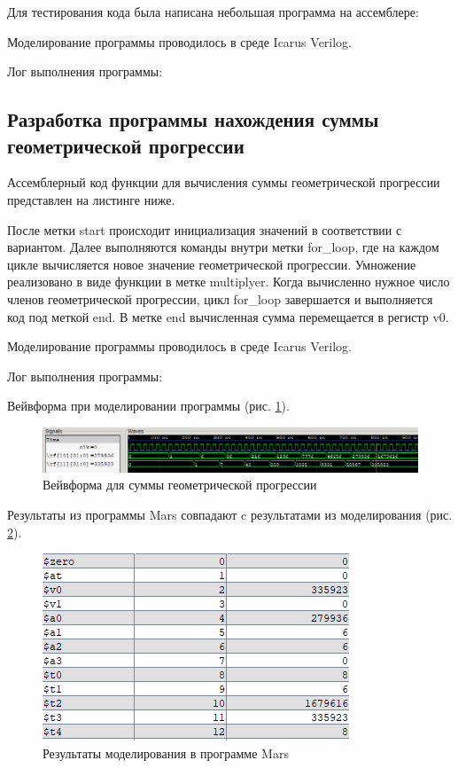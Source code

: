 \documentclass[a4paper,14pt]{article}
\begin{document}
	Для тестирования кода была написана небольшая программа на ассемблере:
		
	{\small {}}
	
	Моделирование программы проводилось в среде Icarus Verilog.
	
	Лог выполнения программы:
	
	{\small {}}
	
	\subsection{Разработка программы нахождения суммы геометрической прогрессии}
	
	Ассемблерный код функции для вычисления суммы геометрической прогрессии представлен на листинге ниже.
	
	{\small {}}
	
	После метки start происходит инициализация значений в соответствии с вариантом.
	Далее выполняются команды внутри метки for\_loop, где на каждом цикле вычисляется новое значение геометрической прогрессии.
	Умножение реализовано в виде функции в метке multiplyer.
	Когда вычисленно нужное число членов геометрической прогрессии, цикл for\_loop завершается и выполняется код под меткой end.
	В метке end вычисленная сумма перемещается в регистр v0.
	
	Моделирование программы проводилось в среде Icarus Verilog.
	
	Лог выполнения программы:
	
	{\small {}}
	
	Вейвформа при моделировании программы (рис. \ref{fig:99wvf}).
	
	\begin{figure}[H]
		\centering
		\includegraphics[width=0.95\linewidth]{images/99_wvf}
		\caption{Вейвформа для суммы геометрической прогрессии}
		\label{fig:99wvf}
	\end{figure}

	Результаты из программы Mars совпадают c результатами из моделирования (рис. \ref{fig:99mars}).

	\begin{figure}[H]
		\centering
		\includegraphics[width=0.5\linewidth]{images/99_mars}
		\caption{Результаты моделирования в программе Mars}
		\label{fig:99mars}
	\end{figure}
\end{document}
